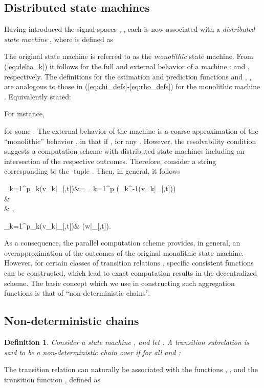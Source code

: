 \documentclass[a4paper, 10pt, conference]{ieeeconf}
\newtheorem{definition}{Definition}
\newcommand{\taut}{{_{[\tau,t]}}}
\newcommand{\akl}{\mathcal{A}_k^{-1}}
\begin{document}
\subsection{Distributed state machines}
\label{sec:distributed_estimation}
Having introduced the signal spaces , , each is now associated with a \emph{distributed state machine} , where  is defined as

The original state machine  is referred to as the \emph{monolithic} state machine. From (\ref{eq:delta_k}) it follows for the full and external behavior of a machine :  and , respectively. The definitions for the estimation and prediction functions  and , , are analogous to those in (\ref{eq:chi_defs}-\ref{eq:rho_defs}) for the monolithic machine . Equivalently stated:

For instance,

for some . The external behavior  of the machine  is a coarse approximation of the ``monolithic'' behavior , in that  if , for any . However, the resolvability condition  suggests a computation scheme with  distributed state machines  including an intersection of the respective outcomes. Therefore, consider a string  corresponding to the -tuple . Then, in general, it follows

\cap_{k=1}^{p}\chi_k(v_k|_{[\tau,t]})&= \cap_{k=1}^{p} \chi(\akl(v_k|\taut))\notag \\
{} & \hspace{.1cm}{\supseteq \chi(\cap_{k=1}^{p}\akl(v_k|\taut))}\notag \\
{} & \hspace{.1cm}{=\chi(w|\taut)},

\label{eq:thm2:2}
\cap_{k=1}^{p}\rho_k(v_k|\taut)& \supseteq \rho(w|\taut).

As a consequence, the parallel computation scheme provides, in general, an overapproximation  of the outcomes of the original monolithic state machine. However, for certain classes of transition relations , specific consistent functions  can be constructed, which lead to exact computation results in the decentralized scheme. The basic concept which we use in constructing such aggregation functions is that of ``non-deterministic chains''.






\subsection{Non-deterministic chains}
\label{sec:Chain-structured state machines}
\begin{definition}\label{def:chain1}
Consider a state machine , and let . A transition subrelation  is said to be a \emph{non-deterministic chain} over  if for all  and :
\vspace{-6pt}

\end{definition}
The transition relation  can naturally be associated with the functions , , and the transition function , defined as
\end{document}
